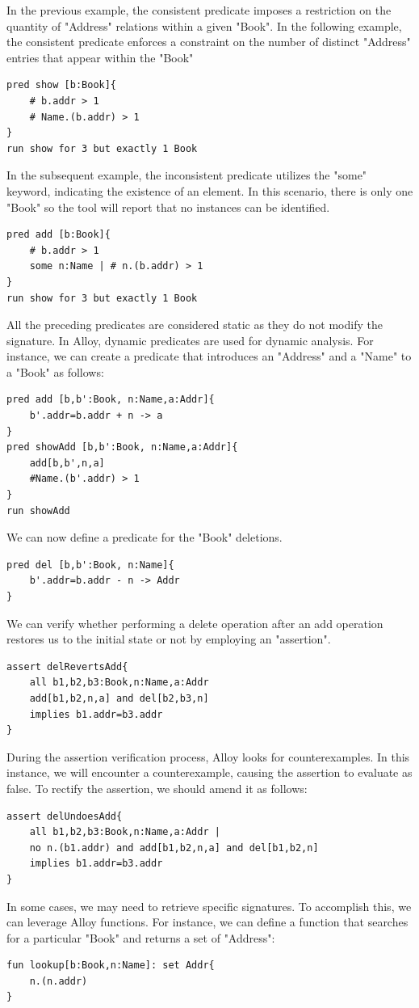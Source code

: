 \documentclass[12pt, a4paper]{report}
\begin{document}
        In the previous example, the consistent predicate imposes a restriction on the quantity of "Address" relations within a given "Book". 
        In the following example, the consistent predicate enforces a constraint on the number of distinct "Address" entries that appear within the "Book"
        \begin{lstlisting}[language=alloy]
pred show [b:Book]{
    # b.addr > 1
    # Name.(b.addr) > 1
}
run show for 3 but exactly 1 Book
        \end{lstlisting}
        In the subsequent example, the inconsistent predicate utilizes the "some" keyword, indicating the existence of an element. 
        In this scenario, there is only one "Book" so the tool will report that no instances can be identified.
        \begin{lstlisting}[language=alloy]
pred add [b:Book]{
    # b.addr > 1
    some n:Name | # n.(b.addr) > 1
}
run show for 3 but exactly 1 Book
        \end{lstlisting}
        All the preceding predicates are considered static as they do not modify the signature. 
        In Alloy, dynamic predicates are used for dynamic analysis. 
        For instance, we can create a predicate that introduces an "Address" and a "Name" to a "Book" as follows:
        \begin{lstlisting}[language=alloy]
pred add [b,b':Book, n:Name,a:Addr]{
    b'.addr=b.addr + n -> a
}
pred showAdd [b,b':Book, n:Name,a:Addr]{
    add[b,b',n,a]
    #Name.(b'.addr) > 1
}
run showAdd
        \end{lstlisting}
        We can now define a predicate for the "Book" deletions.  
        \begin{lstlisting}[language=alloy]
pred del [b,b':Book, n:Name]{
    b'.addr=b.addr - n -> Addr
}
        \end{lstlisting}
        We can verify whether performing a delete operation after an add operation restores us to the initial state or not by employing an "assertion". 
        \begin{lstlisting}[language=alloy]
assert delRevertsAdd{
    all b1,b2,b3:Book,n:Name,a:Addr
    add[b1,b2,n,a] and del[b2,b3,n]
    implies b1.addr=b3.addr
}
        \end{lstlisting}
        During the assertion verification process, Alloy looks for counterexamples. 
        In this instance, we will encounter a counterexample, causing the assertion to evaluate as false.
        To rectify the assertion, we should amend it as follows:
        \begin{lstlisting}[language=alloy]
assert delUndoesAdd{
    all b1,b2,b3:Book,n:Name,a:Addr |
    no n.(b1.addr) and add[b1,b2,n,a] and del[b1,b2,n]
    implies b1.addr=b3.addr
}
        \end{lstlisting}
        In some cases, we may need to retrieve specific signatures. 
        To accomplish this, we can leverage Alloy functions. 
        For instance, we can define a function that searches for a particular "Book" and returns a set of "Address":        
        \begin{lstlisting}[language=alloy]
fun lookup[b:Book,n:Name]: set Addr{
    n.(n.addr)
}
        \end{lstlisting}
    
\end{document}
